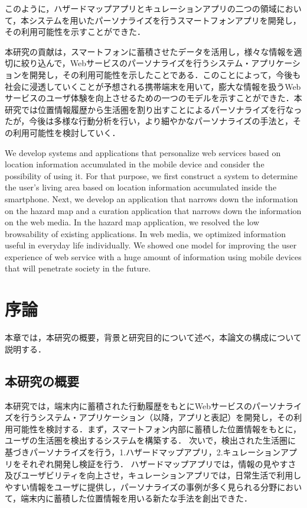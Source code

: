 \documentclass[a4paper]{jsarticle}
\begin{document}
このように，ハザードマップアプリとキュレーションアプリの二つの領域において，本システムを用いたパーソナライズを行うスマートフォンアプリを開発し，その利用可能性を示すことができた．

本研究の貢献は，スマートフォンに蓄積させたデータを活用し，様々な情報を適切に絞り込んで，Webサービスのパーソナライズを行うシステム・アプリケーションを開発し，その利用可能性を示したことである．このことによって，今後も社会に浸透していくことが予想される携帯端末を用いて，膨大な情報を扱うWebサービスのユーザ体験を向上させるための一つのモデルを示すことができた．本研究では位置情報履歴から生活圏を割り出すことによるパーソナライズを行なったが，今後は多様な行動分析を行い，より細やかなパーソナライズの手法と，その利用可能性を検討していく．

We develop systems and applications that personalize web services based on location information accumulated in the mobile device and consider the possibility of using it. For that purpose, we first construct a system to determine the user's living area based on location information accumulated inside the smartphone. Next, we develop an application that narrows down the information on the hazard map and a curation application that narrows down the information on the web media. In the hazard map application, we resolved the low browsability of existing applications. In web media, we optimized information useful in everyday life individually. We showed one model for improving the user experience of web service with a huge amount of information using mobile devices that will penetrate society in the future.
\makemokuji

\newpage

\setcounter{page}{1} %
\section{序論}
本章では，本研究の概要，背景と研究目的について述べ，本論文の構成について説明する．

\subsection{本研究の概要}
本研究では，端末内に蓄積された行動履歴をもとにWebサービスのパーソナライズを行うシステム・アプリケーション（以降，アプリと表記）を開発し，その利用可能性を検討する．まず，スマートフォン内部に蓄積した位置情報をもとに，ユーザの生活圏を検出するシステムを構築する．
次いで，検出された生活圏に基づきパーソナライズを行う，1.ハザードマップアプリ，2.キュレーションアプリをそれぞれ開発し検証を行う．
ハザードマップアプリでは，情報の見やすさ及びユーザビリティを向上させ，キュレーションアプリでは，日常生活で利用しやすい情報をユーザに提供し，パーソナライズの事例が多く見られる分野において，端末内に蓄積した位置情報を用いる新たな手法を創出できた．
\end{document}
